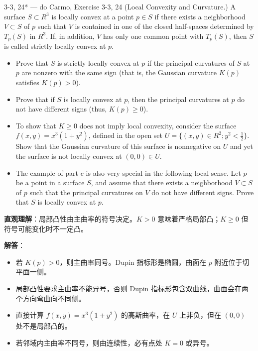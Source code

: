 \begin{exercise}{3-3, 24* — do Carmo, Exercise 3-3, 24}
(Local Convexity and Curvature.) A surface $S \subset R ^ 3$ is locally convex at a point $p \in S$ if there exists a neighborhood $V \subset S$ of $p$ such that $V$ is contained in one of the closed half-spaces determined by $T_p(S)$ in $R ^ 3$. If, in addition, $V$ has only one common point with $T_p(S)$, then $S$ is called strictly locally convex at $p$.
\begin{itemize}
\item[a.] Prove that $S$ is strictly locally convex at $p$ if the principal curvatures of $S$ at $p$ are nonzero with the same sign (that is, the Gaussian curvature $K(p)$ satisfies $K(p) > 0$).
\item[b.] Prove that if $S$ is locally convex at $p$, then the principal curvatures at $p$ do not have different signs (thus, $K(p) \geq 0$).
\item[c.] To show that $K \geq 0$ does not imply local convexity, consider the surface $f(x,y) = x^{3}(1 + y^{2})$, defined in the open set $U = \{(x, y) \in R^2; y^2 < \frac{1}{2}\}$. Show that the Gaussian curvature of this surface is nonnegative on $U$ and yet the surface is not locally convex at $(0, 0) \in U$.
\item[d.] The example of part c is also very special in the following local sense. Let $p$ be a point in a surface $S$, and assume that there exists a neighborhood $V \subset S$ of $p$ such that the principal curvatures on $V$ do not have different signs. Prove that $S$ is locally convex at $p$.
\end{itemize}
\end{exercise}

\begin{solution}
\textbf{直观理解}：局部凸性由主曲率的符号决定。$K > 0$ 意味着严格局部凸；$K \geq 0$ 但符号可能变化时不一定凸。

\textbf{解答}：
\begin{itemize}
\item[a.] 若 $K(p) > 0$，则主曲率同号。Dupin 指标形是椭圆，曲面在 $p$ 附近位于切平面一侧。
\item[b.] 局部凸性要求主曲率不能异号，否则 Dupin 指标形包含双曲线，曲面会在两个方向弯曲向不同侧。
\item[c.] 直接计算 $f(x,y) = x^3(1+y^2)$ 的高斯曲率，在 $U$ 上非负，但在 $(0,0)$ 处不是局部凸的。
\item[d.] 若邻域内主曲率不同号，则由连续性，必有点处 $K = 0$ 或异号。
\end{itemize}
\end{solution}

